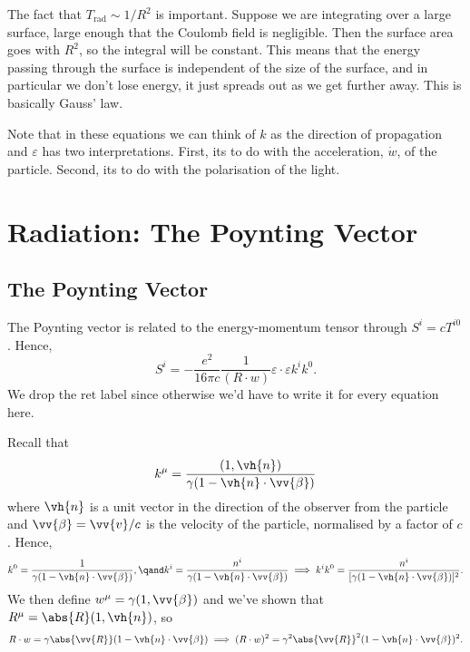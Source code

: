 \documentclass[fleqn]{NotesClass}
\newcommand*{\ret}{{\text{ret}}}
\newcommand*{\rad}{\text{rad}}
\begin{document}
    The fact that \(T_{\rad} \sim 1/R^2\) is important.
    Suppose we are integrating over a large surface, large enough that the Coulomb field is negligible.
    Then the surface area goes with \(R^2\), so the integral will be constant.
    This means that the energy passing through the surface is independent of the size of the surface, and in particular we don't lose energy, it just spreads out as we get further away.
    This is basically Gauss' law.
    
    Note that in these equations we can think of \(k\) as the direction of propagation and \(\varepsilon\) has two interpretations.
    First, its to do with the acceleration, \(\dot{w}\), of the particle.
    Second, its to do with the polarisation of the light.
    
    \chapter{Radiation: The Poynting Vector}
    \section{The Poynting Vector}
    The Poynting vector is related to the energy-momentum tensor through \(S^i = cT^{i0}\).
    Hence,
    \begin{equation}
        S^i = -\frac{e^2}{16\pi c} \frac{1}{(R \cdot w)} \varepsilon \cdot \varepsilon k^i k^0.
    \end{equation}
    We drop the \(\ret\) label since otherwise we'd have to write it for every equation here.
    
    Recall that
    \begin{equation}
        k^\mu = \frac{(1, \vh{n})}{\gamma(1 - \vh{n} \cdot \vv{\beta})}
    \end{equation}
    where \(\vh{n}\) is a unit vector in the direction of the observer from the particle and \(\vv{\beta} = \vv{v}/c\) is the velocity of the particle, normalised by a factor of \(c\).
    Hence,
    \begin{equation*}
        k^0 = \frac{1}{\gamma(1 - \vh{n} \cdot \vv{\beta})}, \qand k^i = \frac{n^i}{\gamma(1 - \vh{n} \cdot \vv{\beta})} \implies k^ik^0 = \frac{n^i}{[\gamma(1 - \vh{n} \cdot \vv{\beta})]^2}.
    \end{equation*}
    We then define \(w^\mu = \gamma(1, \vv{\beta})\) and we've shown that \(R^\mu = \abs{R}(1, \vh{n})\), so
    \begin{equation}
        R \cdot w = \gamma \abs{\vv{R}} (1 - \vh{n} \cdot \vv{\beta}) \implies (R \cdot w)^2 = \gamma^2 \abs{\vv{R}}^2 (1 - \vh{n} \cdot \vv{\beta})^2.
    \end{equation}
    
\end{document}
